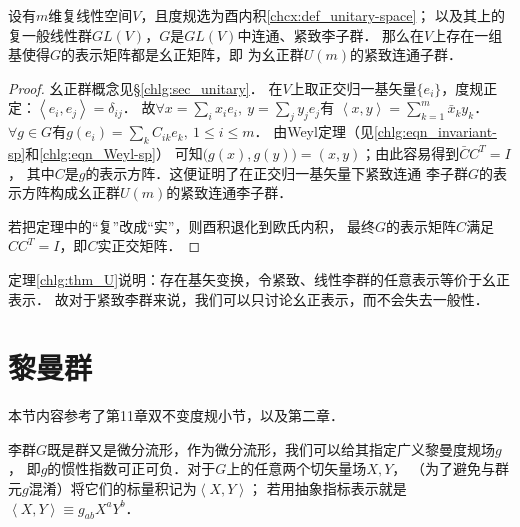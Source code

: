 \begin{theorem}\label{chlg:thm_U}
    设有$m$维复线性空间$V$，且度规选为酉内积\ref{chcx:def_unitary-space}；
    以及其上的复一般线性群$GL(V)$，$G$是$GL(V)$中连通、紧致李子群．
    那么在$V$上存在一组基使得$G$的表示矩阵都是幺正矩阵，即
    为幺正群$U(m)$的紧致连通子群．
\end{theorem}
\begin{proof}
    幺正群概念见\S\ref{chlg:sec_unitary}．
    在$V$上取正交归一基矢量$\{e_i\}$，度规正定：$\left<e_i,e_j\right>=\delta_{ij}$．
    故$\forall x = \sum_i x_i e_i,\ y=\sum_j y_j e_j$有
    $\left<x,y\right>= \sum_{k=1}^{m} \bar{x}_k y_k $．
    $\forall g\in G$有$g(e_i)=\sum_k  C_{ik}e_k, \ 1\leqslant i \leqslant m$．
    由Weyl定理（见\eqref{chlg:eqn_invariant-sp}和\eqref{chlg:eqn_Weyl-sp}）
    可知$\bigl(g(x),g(y)\bigr) = (x,y)$；由此容易得到$\bar{C} C^T = I$，
    其中$C$是$g$的表示方阵．这便证明了在正交归一基矢量下紧致连通
    李子群$G$的表示方阵构成幺正群$U(m)$的紧致连通李子群．
    
    若把定理中的“复”改成“实”，则酉积退化到欧氏内积，
    最终$G$的表示矩阵$C$满足$CC^T=I$，即$C$实正交矩阵．   
\end{proof}

定理\ref{chlg:thm_U}说明：存在基矢变换，令紧致、线性李群的任意表示等价于幺正表示．
故对于紧致李群来说，我们可以只讨论幺正表示，而不会失去一般性．








\section{黎曼群}\label{chlg:sec_bi-invariant-metric}
本节内容参考了\parencite{oneill1983}第11章双不变度规小节，以及\parencite{Alexandrino-2015}第二章．   

李群$G$既是群又是微分流形，作为微分流形，我们可以给其指定广义黎曼度规场$g$，
即$g$的惯性指数可正可负．对于$G$上的任意两个切矢量场$X,Y$，
（为了避免与群元$g$混淆）将它们的标量积记为$\left<X,Y\right>$；
若用抽象指标表示就是$\left<X,Y\right>\equiv g_{ab}X^a Y^b$．


